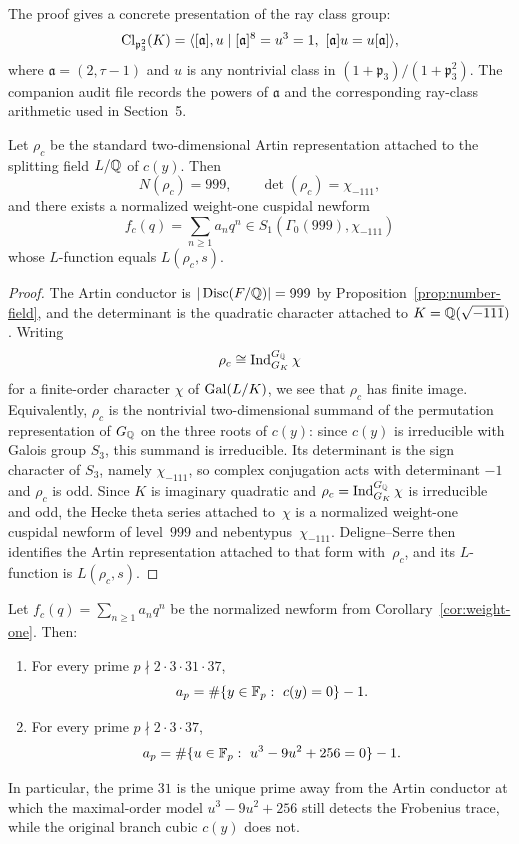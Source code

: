 \begin{remark}\label{rem:ray-class-explicit}
The proof gives a concrete presentation of the ray class group:
\[
\operatorname{Cl}_{\mathfrak p_3^2}(K)=\langle [\mathfrak a],u \mid [\mathfrak a]^8=u^3=1,\ [\mathfrak a]u=u[\mathfrak a]\rangle,
\]
where \(\mathfrak a=(2,\tau-1)\) and \(u\) is any nontrivial class in \((1+\mathfrak p_3)/(1+\mathfrak p_3^2)\). The companion audit file records the powers of \(\mathfrak a\) and the corresponding ray-class arithmetic used in Section~5.
\end{remark}

\begin{corollary}\label{cor:weight-one}
Let \(\rho_c\) be the standard two-dimensional Artin representation attached to the splitting field \(L/\mathbb{Q}\) of \(c(y)\). Then
\[
N(\rho_c)=999,
\qquad
\det(\rho_c)=\chi_{-111},
\]
and there exists a normalized weight-one cuspidal newform
\[
f_c(q)=\sum_{n\geq 1} a_n q^n\in S_1(\Gamma_0(999),\chi_{-111})
\]
whose \(L\)-function equals \(L(\rho_c,s)\).
\end{corollary}

\begin{proof}
The Artin conductor is \(|\operatorname{Disc}(F/\mathbb{Q})|=999\) by Proposition~\ref{prop:number-field}, and the determinant is the quadratic character attached to \(K=\mathbb{Q}(\sqrt{-111})\). Writing
\[
\rho_c\cong \operatorname{Ind}_{G_K}^{G_{\mathbb{Q}}}\chi
\]
for a finite-order character \(\chi\) of \(\operatorname{Gal}(L/K)\), we see that \(\rho_c\) has finite image. Equivalently, \(\rho_c\) is the nontrivial two-dimensional summand of the permutation representation of \(G_{\mathbb{Q}}\) on the three roots of \(c(y)\): since \(c(y)\) is irreducible with Galois group \(S_3\), this summand is irreducible. Its determinant is the sign character of \(S_3\), namely \(\chi_{-111}\), so complex conjugation acts with determinant \(-1\) and \(\rho_c\) is odd. Since \(K\) is imaginary quadratic and \(\rho_c=\operatorname{Ind}_{G_K}^{G_{\mathbb{Q}}}\chi\) is irreducible and odd, the Hecke theta series attached to~\(\chi\) is a normalized weight-one cuspidal newform of level~\(999\) and nebentypus~\(\chi_{-111}\). Deligne--Serre \cite{DeligneSerre1974WeightOne} then identifies the Artin representation attached to that form with~\(\rho_c\), and its \(L\)-function is \(L(\rho_c,s)\).
\end{proof}

\begin{theorem}\label{thm:hecke-traces}
Let \(f_c(q)=\sum_{n\geq 1} a_n q^n\) be the normalized newform from Corollary~\ref{cor:weight-one}. Then:
\begin{enumerate}
\item[(i)] For every prime \(p\nmid 2\cdot 3\cdot 31\cdot 37\),
\[
a_p=\#\{y\in \F_p:\ c(y)=0\}-1.
\]
\item[(ii)] For every prime \(p\nmid 2\cdot 3\cdot 37\),
\[
a_p=\#\{u\in \F_p:\ u^3-9u^2+256=0\}-1.
\]
\end{enumerate}
In particular, the prime \(31\) is the unique prime away from the Artin conductor at which the maximal-order model \(u^3-9u^2+256\) still detects the Frobenius trace, while the original branch cubic \(c(y)\) does not.
\end{theorem}

